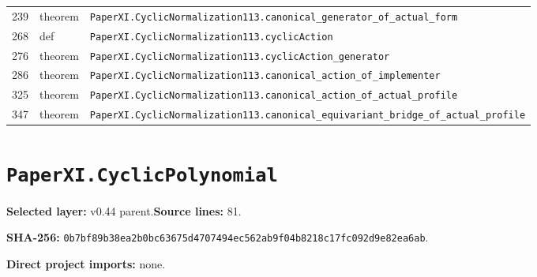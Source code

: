 \documentclass[10pt,oneside]{book}
\begin{document}
\begin{longtable}{@{}p{}p{}p{}@{}}
239&theorem&\nolinkurl{PaperXI.CyclicNormalization113.canonical_generator_of_actual_form}\\

268&def&\nolinkurl{PaperXI.CyclicNormalization113.cyclicAction}\\

276&theorem&\nolinkurl{PaperXI.CyclicNormalization113.cyclicAction_generator}\\

286&theorem&\nolinkurl{PaperXI.CyclicNormalization113.canonical_action_of_implementer}\\

325&theorem&\nolinkurl{PaperXI.CyclicNormalization113.canonical_action_of_actual_profile}\\

347&theorem&\nolinkurl{PaperXI.CyclicNormalization113.canonical_equivariant_bridge_of_actual_profile}\\

\bottomrule\end{longtable}

\section{\texorpdfstring{\nolinkurl{PaperXI.CyclicPolynomial}}{PaperXI.CyclicPolynomial}}\label{module:PaperXI.CyclicPolynomial}

\textbf{Selected layer:} v0.44 parent.\quad\textbf{Source lines:} 81.\par\textbf{SHA-256:} {\scriptsize\nolinkurl{0b7bf89b38ea2b0bc63675d4707494ec562ab9f04b8218c17fc092d9e82ea6ab}}.


\textbf{Direct project imports:} none.
\end{document}
